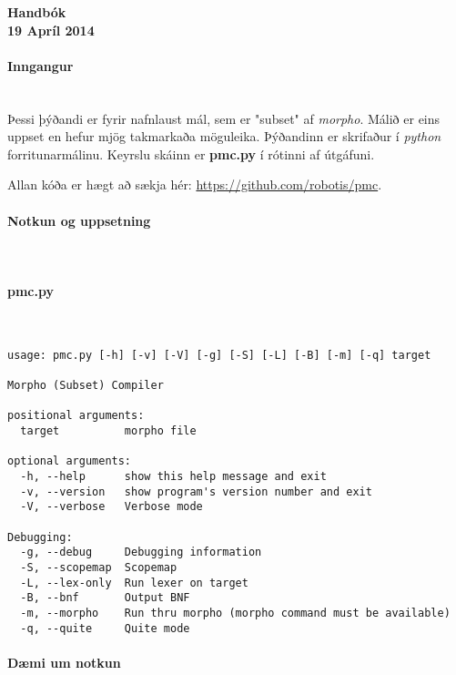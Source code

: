 \documentclass{article}
\begin{document}
\begin{center}
{\LARGE \textbf{Handbók}} ~\\
\textbf{19 Apríl 2014}
\end{center}

\clearpage
\paragraph{\Large Inngangur} ~\\

Þessi þýðandi er fyrir nafnlaust mál, sem er "subset" af \emph{morpho}. Málið er eins uppset en
hefur mjög takmarkaða möguleika. Þýðandinn er skrifaður í \emph{python} forritunarmálinu. Keyrslu skáinn er \textbf{pmc.py} 
í rótinni af útgáfuni.

Allan kóða er hægt að sækja hér: \url{https://github.com/robotis/pmc}.

\clearpage
\paragraph{{\Large Notkun og uppsetning}} ~\\

\paragraph{pmc.py} ~\\

\begin{verbatim}
usage: pmc.py [-h] [-v] [-V] [-g] [-S] [-L] [-B] [-m] [-q] target

Morpho (Subset) Compiler

positional arguments:
  target          morpho file

optional arguments:
  -h, --help      show this help message and exit
  -v, --version   show program's version number and exit
  -V, --verbose   Verbose mode

Debugging:
  -g, --debug     Debugging information
  -S, --scopemap  Scopemap
  -L, --lex-only  Run lexer on target
  -B, --bnf       Output BNF
  -m, --morpho    Run thru morpho (morpho command must be available)
  -q, --quite     Quite mode

\end{verbatim}

\clearpage
\paragraph{Dæmi um notkun} ~\\
\end{document}
